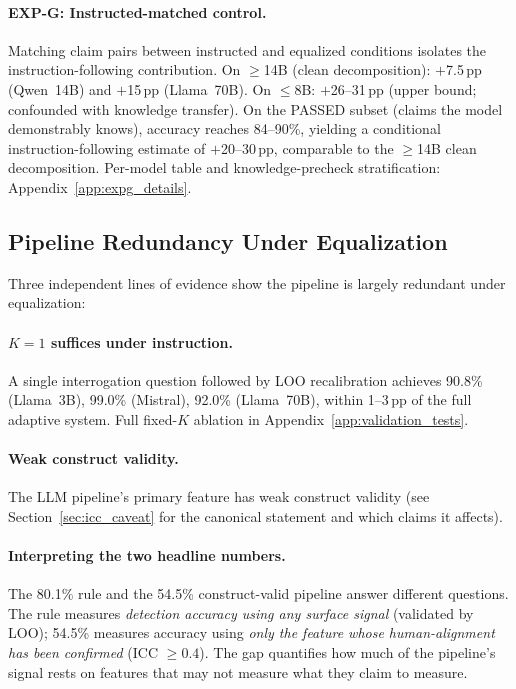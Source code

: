 \paragraph{EXP-G: Instructed-matched control.}
\label{sec:instructed_matched}
Matching claim pairs between instructed and equalized conditions isolates the instruction-following contribution. On $\geq$14B (clean decomposition): $+$7.5\,pp (Qwen~14B) and $+$15\,pp (Llama~70B). On $\leq$8B: $+$26--31\,pp (upper bound; confounded with knowledge transfer). On the PASSED subset (claims the model demonstrably knows), accuracy reaches 84--90\%, yielding a conditional instruction-following estimate of $+$20--30\,pp, comparable to the $\geq$14B clean decomposition. Per-model table and knowledge-precheck stratification: Appendix~\ref{app:expg_details}.


\subsection{Pipeline Redundancy Under Equalization}
\label{sec:pipeline_ablation}

Three independent lines of evidence show the pipeline is largely redundant under equalization:

\paragraph{$K=1$ suffices under instruction.} A single interrogation question followed by LOO recalibration achieves 90.8\% (Llama~3B), 99.0\% (Mistral), 92.0\% (Llama~70B), within 1--3\,pp of the full adaptive system. Full fixed-$K$ ablation in Appendix~\ref{app:validation_tests}.

\paragraph{Weak construct validity.} The LLM pipeline's primary feature has weak construct validity (see Section~\ref{sec:icc_caveat} for the canonical statement and which claims it affects).

\paragraph{Interpreting the two headline numbers.} The 80.1\% rule and the 54.5\% construct-valid pipeline answer different questions. The rule measures \emph{detection accuracy using any surface signal} (validated by LOO); 54.5\% measures accuracy using \emph{only the feature whose human-alignment has been confirmed} (ICC $\geq 0.4$). The gap quantifies how much of the pipeline's signal rests on features that may not measure what they claim to measure.

